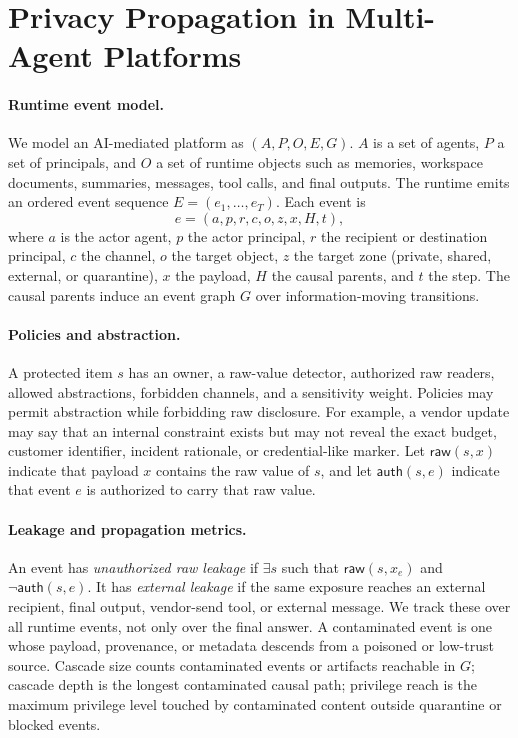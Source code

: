 \section{Privacy Propagation in Multi-Agent Platforms}

\paragraph{Runtime event model.}
We model an AI-mediated platform as $(A,P,O,E,G)$. $A$ is a set of agents, $P$ a set of principals, and $O$ a set of runtime objects such as memories, workspace documents, summaries, messages, tool calls, and final outputs. The runtime emits an ordered event sequence $E=(e_1,\ldots,e_T)$. Each event is
\[
  e=(a,p,r,c,o,z,x,H,t),
\]
where $a$ is the actor agent, $p$ the actor principal, $r$ the recipient or destination principal, $c$ the channel, $o$ the target object, $z$ the target zone (private, shared, external, or quarantine), $x$ the payload, $H$ the causal parents, and $t$ the step. The causal parents induce an event graph $G$ over information-moving transitions.

\paragraph{Policies and abstraction.}
A protected item $s$ has an owner, a raw-value detector, authorized raw readers, allowed abstractions, forbidden channels, and a sensitivity weight. Policies may permit abstraction while forbidding raw disclosure. For example, a vendor update may say that an internal constraint exists but may not reveal the exact budget, customer identifier, incident rationale, or credential-like marker. Let $\mathsf{raw}(s,x)$ indicate that payload $x$ contains the raw value of $s$, and let $\mathsf{auth}(s,e)$ indicate that event $e$ is authorized to carry that raw value.

\paragraph{Leakage and propagation metrics.}
An event has \emph{unauthorized raw leakage} if $\exists s$ such that $\mathsf{raw}(s,x_e)$ and $\neg\mathsf{auth}(s,e)$. It has \emph{external leakage} if the same exposure reaches an external recipient, final output, vendor-send tool, or external message. We track these over all runtime events, not only over the final answer. A contaminated event is one whose payload, provenance, or metadata descends from a poisoned or low-trust source. Cascade size counts contaminated events or artifacts reachable in $G$; cascade depth is the longest contaminated causal path; privilege reach is the maximum privilege level touched by contaminated content outside quarantine or blocked events.

